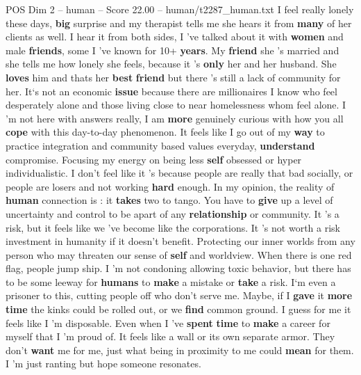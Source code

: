 \begin{textsample}{POS Dim 2 – human – Score 22.00 – human/t2287\_human.txt}  \label{ex:f2_pos_029}
I feel really lonely these days, \textbf{big} surprise and my therapist tells me she hears it from \textbf{many} of her clients as well.
I hear it from both sides, I ’ve talked about it with \textbf{women} and male \textbf{friends}, some I ’ve known for 10+ \textbf{years}.
My \textbf{friend} she ’s married and she tells me how lonely she feels, because it ’s \textbf{only} her and her husband.
She \textbf{loves} him and thats her \textbf{best} \textbf{friend} but there ’s still a lack of community for her.
It‘s not an economic \textbf{issue} because there are millionaires I know who feel desperately alone and those living close to near homelessness whom feel alone.
I ’m not here with answers really, I am \textbf{more} genuinely curious with how you all \textbf{cope} with this day-to-day phenomenon.
It feels like I go out of my \textbf{way} to practice integration and community based values everyday, \textbf{understand} compromise.
Focusing my energy on being less \textbf{self} obsessed or hyper individualistic.
I don't feel like it ’s because people are really that bad socially, or people are losers and not working \textbf{hard} enough.
In my opinion, the reality of \textbf{human} connection is : it \textbf{takes} two to tango.
You have to \textbf{give} up a level of uncertainty and control to be apart of any \textbf{relationship} or community.
It ’s a risk, but it feels like we ’ve become like the corporations.
It ’s not worth a risk investment in humanity if it doesn't benefit.
Protecting our inner worlds from any person who may threaten our sense of \textbf{self} and worldview.
When there is one red flag, people jump ship.
I ’m not condoning allowing toxic behavior, but there has to be some leeway for \textbf{humans} to \textbf{make} a mistake or \textbf{take} a risk.
I‘m even a prisoner to this, cutting people off who don't serve me.
Maybe, if I \textbf{gave} it \textbf{more} \textbf{time} the kinks could be rolled out, or we \textbf{find} common ground.
I guess for me it feels like I ’m disposable.
Even when I ’ve \textbf{spent} \textbf{time} to \textbf{make} a career for myself that I ’m proud of.
It feels like a wall or its own separate armor.
They don't \textbf{want} me for me, just what being in proximity to me could \textbf{mean} for them.
I ’m just ranting but hope someone resonates.

\end{textsample}
